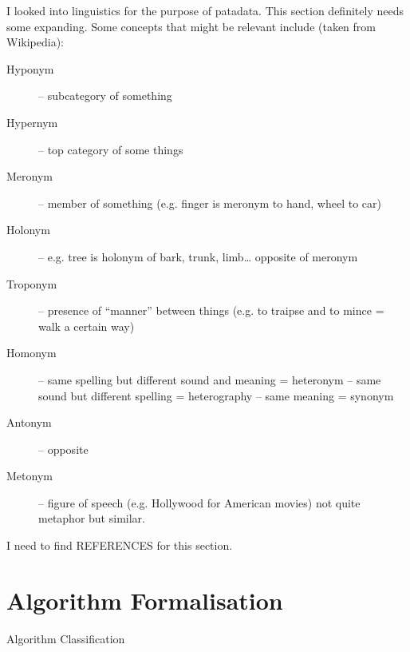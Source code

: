 I looked into linguistics for the purpose of patadata. This section definitely needs some expanding. Some concepts that might be relevant include (taken from Wikipedia):

\begin{description}
  \item [Hyponym] – subcategory of something
  \item [Hypernym] – top category of some things
  \item [Meronym] – member of something (e.g. finger is meronym to hand, wheel to car)
  \item [Holonym] – e.g. tree is holonym of bark, trunk, limb… opposite of meronym
  \item [Troponym] – presence of “manner” between things (e.g. to traipse and to mince = walk a certain way)
  \item [Homonym] – same spelling but different sound and meaning = heteronym – same sound but different spelling = heterography – same meaning = synonym
  \item [Antonym] – opposite
  \item [Metonym] – figure of speech (e.g. Hollywood for American movies) not quite metaphor but similar.
\end{description}

I need to find REFERENCES for this section.



\section{Algorithm Formalisation}

Algorithm Classification

